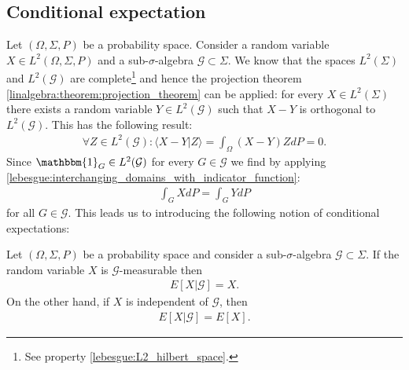 \subsection{Conditional expectation}

    Let $(\Omega,\Sigma,P)$ be a probability space. Consider a random variable $X\in L^2(\Omega,\Sigma,P)$ and a sub-$\sigma$-algebra $\mathcal{G}\subset\Sigma$. We know that the spaces $L^2(\Sigma)$ and $L^2(\mathcal{G})$ are complete\footnote{See property \ref{lebesgue:L2_hilbert_space}.} and hence the projection theorem \ref{linalgebra:theorem:projection_theorem} can be applied: for every $X\in L^2(\Sigma)$ there exists a random variable $Y\in L^2(\mathcal{G})$ such that $X-Y$ is orthogonal to $L^2(\mathcal{G})$. This has the following result:
    \begin{gather}
        \forall Z\in L^2(\mathcal{G}):\langle X-Y|Z \rangle = \int_\Omega(X-Y)ZdP = 0.
    \end{gather}
    Since $\mathbbm{1}_G\in L^2(\mathcal{G})$ for every $G\in\mathcal{G}$ we find by applying \ref{lebesgue:interchanging_domains_with_indicator_function}:
    \begin{gather}
        \label{prob:conditional_expectation_condition}
        \int_G XdP = \int_G YdP
    \end{gather}
    for all $G\in\mathcal{G}$. This leads us to introducing the following notion of conditional expectations:

    \begin{property}\label{prob:conditional_expectation_props}
        Let $(\Omega, \Sigma, P)$ be a probability space and consider a sub-$\sigma$-algebra $\mathcal{G}\subset\Sigma$. If the random variable $X$ is $\mathcal{G}$-measurable then
        \begin{gather}
            E[X|\mathcal{G}] = X.
        \end{gather}
        On the other hand, if $X$ is independent of $\mathcal{G}$, then
        \begin{gather}
            E[X|\mathcal{G}] = E[X].
        \end{gather}
    \end{property}

